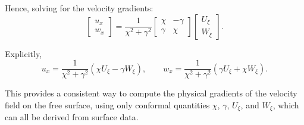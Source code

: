 \documentclass[12pt]{article}
\begin{document}
Hence, solving for the velocity gradients:
\[
\begin{bmatrix}
u_x \\
w_x
\end{bmatrix}
=
\frac{1}{\chi^2 + \gamma^2}
\begin{bmatrix}
\chi & -\gamma \\
\gamma & \chi
\end{bmatrix}
\begin{bmatrix}
U_\xi \\
W_\xi
\end{bmatrix}.
\]

Explicitly,
\[
u_x = \frac{1}{\chi^2 + \gamma^2} \left( \chi U_\xi - \gamma W_\xi \right), \qquad
w_x = \frac{1}{\chi^2 + \gamma^2} \left( \gamma U_\xi + \chi W_\xi \right).
\]

This provides a consistent way to compute the physical gradients of the velocity field on the free surface, using only conformal quantities \(\chi\), \(\gamma\), \(U_\xi\), and \(W_\xi\), which can all be derived from surface data.
\end{document}
